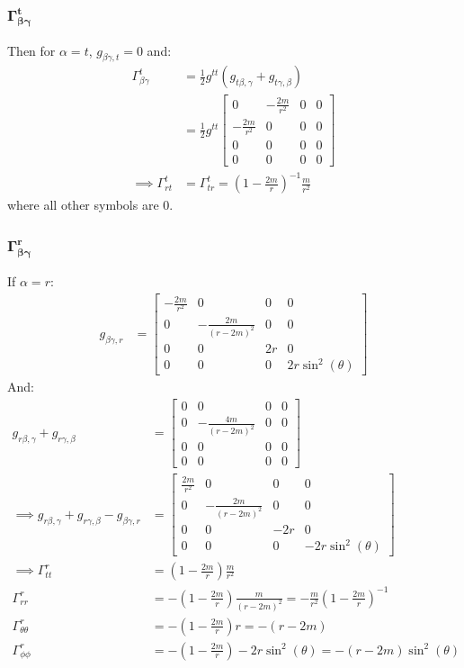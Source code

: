 \documentclass[a4paper]{article}
\begin{document}
\subsubsection{$\boldsymbol{\Gamma^t_{\beta \gamma}}$}
Then for $\alpha = t$, $g_{\beta\gamma,t} = 0$ and:
\begin{align*}
	\Gamma^t_{\beta \gamma} &= \frac{1}{2} g^{tt}(g_{t\beta , \gamma} + g_{t \gamma , \beta})\\
	&= \frac{1}{2} g^{tt} \begin{bmatrix} 0 & -\frac{2m}{r^2} & 0 & 0 \\
		-\frac{2m}{r^2} & 0 & 0 & 0\\
		0 & 0 & 0 & 0 \\
		0 & 0 & 0 & 0
\end{bmatrix}\\
\implies \Gamma^t_{r t} &=  \Gamma^t_{t r} = \left(1-\frac{2m}{r}\right)^{-1} \frac{m}{r^2}
\end{align*}
where all other symbols are 0.

\subsubsection{$\boldsymbol{\Gamma^r_{\beta \gamma}}$}
If $\alpha = r$:
\begin{align*}
	g_{\beta\gamma,r} &= \begin{bmatrix} -\frac{2m}{r^2} & 0  & 0 & 0 \\
				0 & -\frac{2m}{(r-2m)^2} & 0 & 0\\
				0 & 0 & 2r & 0  \\
				0 & 0 & 0 & 2r\sin^2(\theta)
			\end{bmatrix}
\end{align*}
And:
\begin{align*}
	g_{r\beta , \gamma} + g_{r \gamma , \beta} &= \begin{bmatrix} 0 & 0 & 0 & 0 \\
		0 & -\frac{4m}{(r-2m)^2} & 0 & 0\\
		0 & 0 & 0 & 0 \\
		0 & 0 & 0 & 0
\end{bmatrix}\\
\implies 	g_{r\beta , \gamma} + g_{r \gamma , \beta} - g_{\beta\gamma,r} &= \begin{bmatrix} \frac{2m}{r^2} & 0 & 0 & 0 \\
	0 & -\frac{2m}{(r-2m)^2} & 0 & 0\\
	0 & 0 & -2r & 0  \\
	0 & 0 & 0 & -2r\sin^2(\theta)
\end{bmatrix}\\
\implies \Gamma^r_{tt} &=  \left( 1 - \frac{2m}{r} \right) \frac{m}{r^2}\\
\Gamma^r_{rr} &=  -\left( 1 - \frac{2m}{r} \right) \frac{m}{(r-2m)^2} =  -\frac{m}{r^2} \left(1-\frac{2m}{r}\right)^{-1} \\
\Gamma^r_{\theta \theta} &=  -\left( 1 - \frac{2m}{r} \right) r =  -\left( r - 2m \right) \\
\Gamma^r_{\phi \phi} &=  -\left( 1 - \frac{2m}{r} \right) -2r\sin^2(\theta) =  -\left( r - 2m \right) \sin^2(\theta)
\end{align*}
\end{document}
